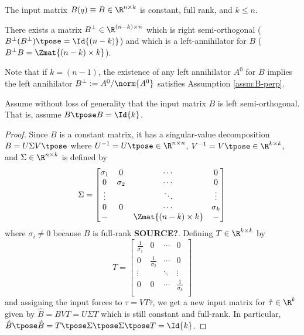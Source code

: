 \begin{assm}\label{assm:B-const}
    The input matrix \(B(q) \equiv B \in \R^{n\times k}\) is constant,
    full rank, and \(k \leq n\).
\end{assm}
\begin{assm}\label{assm:B-perp}
    There exists a matrix 
    \(B^\perp \in \R^{(n-k)\times n}\)
    which is right semi-orthogonal 
    (\ie \(B^\perp(B^\perp)\tpose = \Id{(n-k)}\))
    and which is a left-annihilator for \(B\)
    (\ie \(B^\perp B = \Zmat{(n-k) \times k}\)).
\end{assm}

Note that if \(k = (n-1)\), the existence of any left annihilator \(A^0\) for
\(B\) implies the left annihilator \(B^\perp := A^0/\norm{A^0}\) satisfies Assumption
\ref{assm:B-perp}.

\begin{assm}\label{assm:B-orthogonal}
    Assume without loss of generality that the input matrix \(B\) is left
    semi-orthogonal.
    That is, assume \(B\tpose B = \Id{k}\).
\end{assm}
\begin{proof}
Since \(B\) is a constant matrix, 
it has a singular-value decomposition 
\(B = U \Sigma V\tpose\) where \(U^{-1} = U\tpose \in \R^{n \times n}\), 
\(V^{-1} = V\tpose \in \R^{k \times k}\), and \(\Sigma \in \R^{n \times k}\) is
defined by
\[
    \Sigma = \begin{bmatrix}
        \sigma_1 & 0 & \cdots & 0 \\
        0 & \sigma_2 & \cdots & 0 \\
        \vdots & & \ddots & \vdots \\
        0 & 0 & \cdots & \sigma_k \\
        - &   & \Zmat{(n-k)\times k} & -  \\
    \end{bmatrix}
\]
where \(\sigma_i \neq 0\) because \(B\) is full-rank \textbf{SOURCE?}.
Defining \(T \in \R^{k \times k}\) by
\[
    T = \begin{bmatrix}
        \frac{1}{\sigma_1} & 0 & \cdots & 0 \\
        0 & \frac{1}{\sigma_2} & \cdots & 0 \\
    \vdots & & \ddots & \vdots \\
    0 & 0 & \cdots & \frac{1}{\sigma_k} \\
    \end{bmatrix}
\]
and assigning the input forces to \(\tau = V T \hat{\tau}\), we get a new input
matrix for \(\hat{\tau} \in \R^k\) given by \(\hat{B} = B V T = U \Sigma T\) 
which is still constant and full-rank. In particular, 
\(\hat{B}\tpose \hat{B} = T\tpose \Sigma\tpose \Sigma\tpose T = \Id{k}\).
\end{proof}

